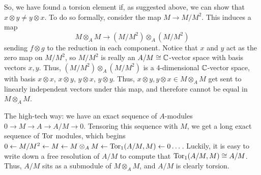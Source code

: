 \begin{solution}
\begin{enumerate}
    So, we have found a torsion element if, as suggested above, we can show that $x \otimes y \neq y \otimes x$. To do so formally, consider the map $M \to M/M^2$. This induces a map \[M \otimes_A M \to (M/M^2) \otimes_A (M/M^2)\] sending $f \otimes g$ to the reduction in each component. Notice that $x$ and $y$ act as the zero map on $M/M^2$, so $M/M^2$ is really an $A/M \cong \mathbb{C}$-vector space with basis vectors $x,y$. Thus, $(M/M^2) \otimes_A (M/M^2)$ is a 4-dimensional $\mathbb{C}$-vector space, with basis $x \otimes x$, $x \otimes y$, $y \otimes x$, $y \otimes y$. Thus, $x \otimes y, y \otimes x \in M \otimes_A M$ get sent to linearly independent vectors under this map, and therefore cannot be equal in $M \otimes_A M$.

    The high-tech way: we have an exact sequence of $A$-modules $0 \to M \to A \to A/M \to 0$. Tensoring this sequence with $M$, we get a long exact sequence of $\operatorname{Tor}$ modules, which begins $0 \leftarrow M/M^2 \leftarrow M \leftarrow M \otimes_A M \leftarrow \operatorname{Tor}_1(A/M,M) \leftarrow 0 \dots$. Luckily, it is easy to write down a free resolution of $A/M$ to compute that $\operatorname{Tor}_1(A/M,M) \cong A/M$. Thus, $A/M$ sits as a submodule of $M \otimes_A M$, and $A/M$ is clearly torsion.
\end{enumerate}
\end{solution}



